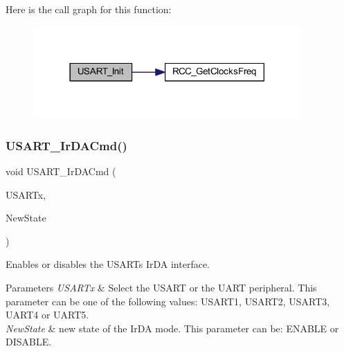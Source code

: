 Here is the call graph for this function\+:
\nopagebreak
\begin{figure}[H]
\begin{center}
\leavevmode
\includegraphics[width=290pt]{group___u_s_a_r_t___private___functions_ga98da340ea0324002ba1b4263e91ab2ff_cgraph}
\end{center}
\end{figure}
\mbox{\label{group___u_s_a_r_t___private___functions_gabff56ebb494fdfadcc6ef4fe9ac8dd24}} 
\subsubsection{\texorpdfstring{U\+S\+A\+R\+T\+\_\+\+Ir\+D\+A\+Cmd()}{USART\_IrDACmd()}}
{\footnotesize\ttfamily void U\+S\+A\+R\+T\+\_\+\+Ir\+D\+A\+Cmd (\begin{DoxyParamCaption}\item[{\hyperlink{struct_u_s_a_r_t___type_def}{U\+S\+A\+R\+T\+\_\+\+Type\+Def} $\ast$}]{U\+S\+A\+R\+Tx,  }\item[{\hyperlink{group___exported__types_gac9a7e9a35d2513ec15c3b537aaa4fba1}{Functional\+State}}]{New\+State }\end{DoxyParamCaption})}



Enables or disables the U\+S\+A\+RT\textquotesingle{}s Ir\+DA interface. 


\begin{DoxyParams}{Parameters}
{\em U\+S\+A\+R\+Tx} & Select the U\+S\+A\+RT or the U\+A\+RT peripheral. This parameter can be one of the following values\+: U\+S\+A\+R\+T1, U\+S\+A\+R\+T2, U\+S\+A\+R\+T3, U\+A\+R\+T4 or U\+A\+R\+T5. \\
\hline
{\em New\+State} & new state of the Ir\+DA mode. This parameter can be\+: E\+N\+A\+B\+LE or D\+I\+S\+A\+B\+LE. \\
\hline
\end{DoxyParams}

